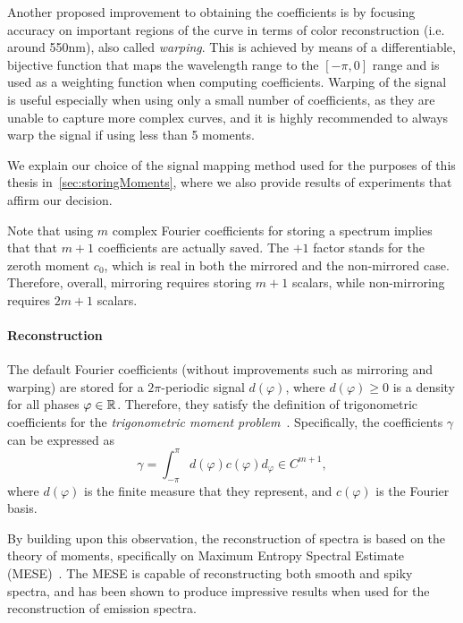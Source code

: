 Another proposed improvement to obtaining the coefficients is by focusing accuracy on important regions of the curve in terms of color reconstruction (i.e. around 550nm), also called \emph{warping}. This is achieved by means of a differentiable, bijective function that maps the wavelength range to the $[-\pi, 0]$ range and is used as a weighting function when computing coefficients. Warping of the signal is useful especially when using only a small number of coefficients, as they are unable to capture more complex curves, and it is highly recommended to always warp the signal if using less than 5 moments.

We explain our choice of the signal mapping method used for the purposes of this thesis in~\cref{sec:storingMoments}, where we also provide results of experiments that affirm our decision.

Note that using $m$ complex Fourier coefficients for storing a spectrum implies that that $m+1$ coefficients are actually saved. The $+1$ factor stands for the zeroth moment $c_0$, which is real in both the mirrored and the non-mirrored case. Therefore, overall, mirroring requires storing $m+1$ scalars, while non-mirroring requires $2m+1$ scalars.

\paragraph{Reconstruction} 

The default Fourier coefficients (without improvements such as mirroring and warping) are stored for a $2\pi$-periodic signal $d(\varphi)$, where $d(\varphi) \ge 0$ is a density for all phases $\varphi \in \mathbb{R}$. Therefore, they satisfy the definition of trigonometric coefficients for the \emph{trigonometric moment problem}~\cite{trigonometricMomentProblemDefiniton}. Specifically, the coefficients $\gamma$ can be expressed as
\begin{equation} \label{trigonometricCoeffsComputation}
\gamma = \int_{-\pi}^{\pi} d(\varphi) c(\varphi)d_\varphi \in C^{m+1},
\end{equation}
where $d(\varphi)$ is the finite measure that they represent, and $c(\varphi)$ is the Fourier basis.

By building upon this observation, the reconstruction of spectra is based on the theory of moments, specifically on Maximum Entropy Spectral Estimate (MESE)~\cite{unboundedMESEoriginal}. The MESE is capable of reconstructing both smooth and spiky spectra, and has been shown to produce impressive results when used for the reconstruction of emission spectra.

